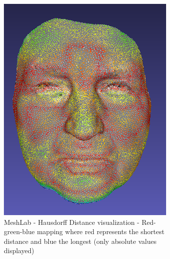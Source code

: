 \begin{figure}[h]
\centering
	\begin{subfigure}{0.3\textwidth}
	\includegraphics[width=\textwidth]{./img/meshlab-example01.PNG}
    \caption{MeshLab - Hausdorff Distance visualization - Red-green-blue mapping where red represents the shortest distance and blue the longest (only absolute values displayed)}
    \label{fig:meshlab_example}
	\end{subfigure}
    \qquad
    \begin{subfigure}{0.3\textwidth}

\end{subfigure}
\end{figure}
